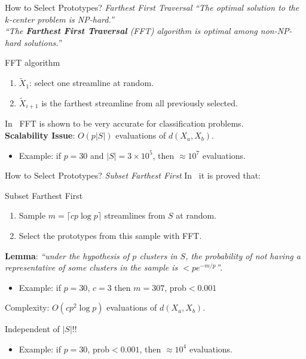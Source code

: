 \documentclass{beamer}
\begin{document}
\begin{frame}{How to Select Prototypes? \emph{Farthest First Traversal}}
  \emph{``The optimal solution to the $k$-center problem is
    NP-hard.''}\\
  \emph{``The \textbf{Farthest First Traversal} (FFT) algorithm is optimal
    among non-NP-hard solutions.''}~\cite{hochbaum1985best}
\begin{block}{FFT algorithm}
    \begin{enumerate}
    \item $\tilde{X}_1$: select one streamline at random.
    \item $\tilde{X}_{i+1}$ is the farthest streamline from all
      previously selected.
    \end{enumerate}
  \end{block}
  In~\cite{pekalska2006prototype} FFT is shown to be very accurate for
  classification problems.\\
  \textbf{Scalability Issue}: $O(p|S|)$ evaluations of $d(X_a,X_b)$.
    \begin{itemize}
    \item Example: if $p=30$ and $|S|=3 \times 10^5$, then $\approx
      10^7$ evaluations.
    \end{itemize}
\end{frame}

\begin{frame}{How to Select Prototypes? \emph{Subset Farthest First}}
In~\cite{turnbull2005fast} it is proved that:
  \begin{block}{Subset Farthest First}
    \begin{enumerate}
    \item Sample $m = \lceil c p \log p \rceil$ streamlines from $S$
      at random.
    \item Select the prototypes from this sample with FFT.
    \end{enumerate}
  \end{block}
  \textbf{Lemma}: \emph{``under the hypothesis of $p$ clusters in $S$, the probability of not
      having a representative of some clusters in the sample is $< p
      e^{-m/p}$''}.
    \begin{itemize}
    \item Example: if $p=30$, $c=3$ then $m=307$, prob$<0.001$
    \end{itemize}
    Complexity: $O(c p^2 \log p)$ evaluations of
    $d(X_a,X_b)$.
    \begin{center}
      \alert{Independent of $|S|$!!}
    \end{center}
    \begin{itemize}
    \item Example: if $p=30$, prob$<0.001$, then $\approx 10^4$ evaluations.
    \end{itemize}
\end{frame}
\end{document}

